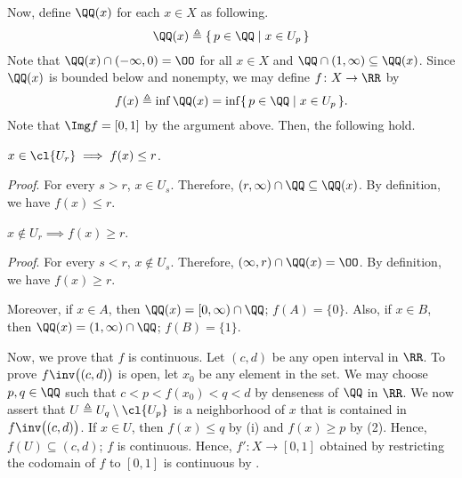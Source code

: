 \documentclass[MAS331_Note.tex]{subfiles}
\begin{document}
{    Now, define $\QQ(x)$ for each $x \in X$ as following.
    \[
        \QQ(x) \triangleq \{\,p \in \QQ \mid x \in U_p \,\}
    \]
    Note that $\QQ(x) \cap (-\infty, 0) = \OO$ for all $x \in X$ and
    $\QQ \cap (1, \infty) \subseteq \QQ(x)$. Since $\QQ(x)$
    is bounded below and nonempty, we may define $f \colon X \to \RR$ by
    \[
        f(x) \triangleq \inf \QQ(x)
        = \inf\{\,p \in \QQ \mid x \in U_p \,\}\text{.}
    \]
    Note that $\Img f = [0, 1]$ by the argument above.
    Then, the following hold.
    \begin{enumerate}[nolistsep, label=(\roman*)]
        \ii $x \in \cl{U_r} \implies f(x) \le r$.
            \begin{itemize}[nolistsep]
                \ii \textit{Proof}. For every $s > r$, $x \in U_s$. Therefore,
                    $(r, \infty) \cap \QQ \subseteq \QQ(x)$. By definition,
                    we have $f(x) \le r$.
            \end{itemize}
        \ii $x \notin U_r \implies f(x) \ge r$.
            \begin{itemize}[nolistsep]
                \ii \textit{Proof}. For every $s < r$, $x \notin U_s$. Therefore,
                    $(\infty, r) \cap \QQ(x) = \OO$. By definition,
                    we have $f(x) \ge r$.
            \end{itemize}
    \end{enumerate}
    Moreover, if $x \in A$, then $\QQ(x) = [0, \infty) \cap \QQ$; $f(A) = \{0\}$.
    Also, if $x \in B$, then $\QQ(x) = (1, \infty) \cap \QQ$; $f(B) = \{1\}$.

    Now, we prove that $f$ is continuous. Let $(c, d)$ be any open interval
    in $\RR$. To prove $f\inv \big((c, d)\big)$ is open, let $x_0$ be any
    element in the set. We may choose $p, q \in \QQ$ such that
    $c < p < f(x_0) < q < d$ by denseness of $\QQ$ in $\RR$.
    We now assert that $U \triangleq U_q \setminus \cl{U_p}$ is a neighborhood
    of $x$ that is contained in $f\inv \big((c, d)\big)$. If $x \in U$, then
    $f(x) \le q$ by (i) and $f(x) \ge p$ by (2). Hence, $f(U) \subseteq (c, d)$;
    $f$ is continuous.
    Hence, $f' \colon X \to [0, 1]$ obtained by restricting the codomain of $f$
    to $[0, 1]$ is continuous by .
}

\end{document}
